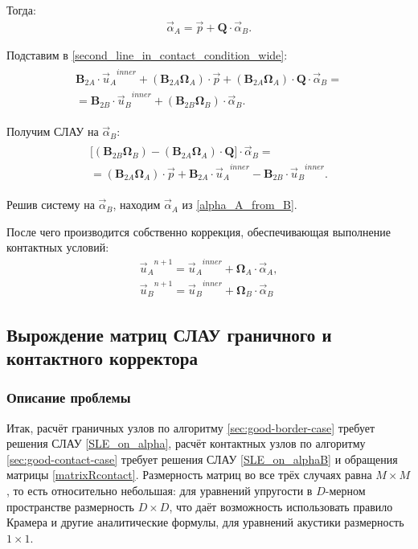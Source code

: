 Тогда:
\begin{eqnarray}
\label{alpha_A_from_B}
\vec{\alpha}_A = \vec{p} + \mathbf{Q} \cdot \vec{\alpha}_B.
\end{eqnarray}

Подставим в \eqref{second_line_in_contact_condition_wide}:
\begin{eqnarray}
\begin{split}
\mathbf{B}_{2A} \cdot {\vec{u}_A}^{inner} + (\mathbf{B}_{2A} \mathbf{\Omega}_A) \cdot \vec{p} + (\mathbf{B}_{2A} \mathbf{\Omega}_A) \cdot \mathbf{Q} \cdot \vec{\alpha}_B = \\ =
\mathbf{B}_{2B} \cdot {\vec{u}_B}^{inner} + (\mathbf{B}_{2B} \mathbf{\Omega}_B) \cdot \vec{\alpha}_B.
\end{split}
\end{eqnarray}

Получим СЛАУ на $\vec{\alpha}_B$:
\begin{eqnarray}
\label{SLE_on_alphaB}
\begin{split}
\Bigg[  (\mathbf{B}_{2B} \mathbf{\Omega}_B) - (\mathbf{B}_{2A} \mathbf{\Omega}_A) \cdot \mathbf{Q}  \Bigg] \cdot \vec{\alpha}_B = \\ = 
(\mathbf{B}_{2A} \mathbf{\Omega}_A) \cdot \vec{p} + \mathbf{B}_{2A} \cdot {\vec{u}_A}^{inner} - \mathbf{B}_{2B} \cdot {\vec{u}_B}^{inner}.
\end{split}
\end{eqnarray}

Решив систему на $\vec{\alpha}_B$, находим $\vec{\alpha}_A$ из \eqref{alpha_A_from_B}.

После чего производится собственно коррекция, обеспечивающая выполнение контактных условий:
\begin{eqnarray}
{\vec{u}_A}^{n+1} = {\vec{u}_A}^{inner} + \mathbf{\Omega}_A \cdot \vec{\alpha}_A, \\
{\vec{u}_B}^{n+1} = {\vec{u}_B}^{inner} + \mathbf{\Omega}_B \cdot \vec{\alpha}_B
\end{eqnarray}


\subsection{Вырождение матриц СЛАУ граничного и контактного корректора}
\subsubsection{Описание проблемы}
\label{degeneration_problem}
Итак, расчёт граничных узлов по алгоритму \ref{sec:good-border-case} 
требует решения СЛАУ \ref{SLE_on_alpha}, 
расчёт контактных узлов по алгоритму \ref{sec:good-contact-case} требует 
решения СЛАУ \ref{SLE_on_alphaB} и обращения матрицы \ref{matrixRcontact}.
Размерность матриц во все трёх случаях равна $M \times M$, 
то есть относительно небольшая: для уравнений упругости в $D$-мерном 
пространстве размерность $D \times D$, что даёт возможность 
использовать правило Крамера и другие аналитические формулы, 
для уравнений акустики размерность $1 \times 1$. 

